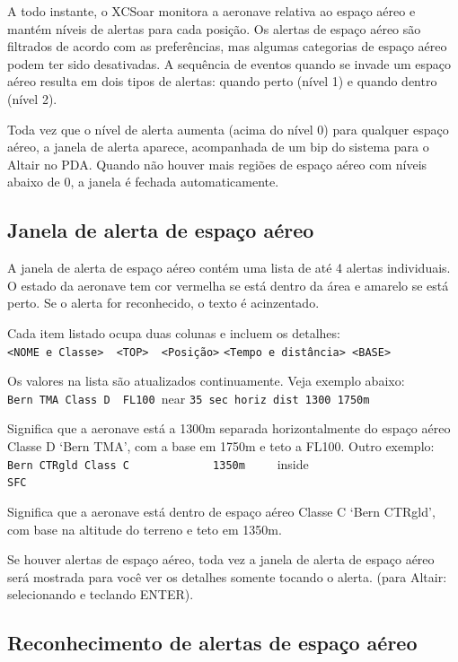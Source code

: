 A todo instante, o XCSoar monitora a aeronave relativa ao espaço aéreo e mantém níveis de alertas para cada posição.  Os alertas de espaço aéreo são filtrados de acordo com as preferências, mas algumas categorias de espaço aéreo podem ter sido desativadas.  
A sequência de eventos quando se invade um espaço aéreo resulta em dois tipos de alertas: quando perto (nível 1) e quando dentro (nível 2).

Toda vez que o nível de alerta aumenta (acima do nível 0) para qualquer espaço aéreo, a janela de alerta aparece, acompanhada de um bip do sistema para o Altair no PDA.  Quando não houver mais regiões de espaço aéreo com níveis abaixo de 0, a janela é fechada automaticamente. 


\subsection*{Janela de alerta de espaço aéreo}

A janela de alerta de espaço aéreo contém uma lista de até 4 alertas individuais.  O estado da aeronave tem cor vermelha se está dentro da área e amarelo se está perto.  Se o alerta for reconhecido, o texto é acinzentado.

Cada item listado ocupa duas colunas e incluem os detalhes:\\
\verb+<NOME e Classe>  <TOP>  <Posição>+ \verb+<Tempo e distância> <BASE>+

Os valores na lista são atualizados continuamente.  Veja exemplo abaixo: \\
\verb+Bern TMA Class D  FL100 +\colorbox{AirspaceYellow}{near} \verb+35 sec horiz dist 1300 1750m+

Significa que a aeronave está a 1300m separada horizontalmente do espaço aéreo Classe D `Bern TMA', com a base em 1750m e teto a FL100.
Outro exemplo:\\
\verb+Bern CTRgld Class C             1350m     +\colorbox{AirspaceRed}{inside}
\verb+                                SFC+

Significa que a aeronave está dentro de espaço aéreo Classe C `Bern CTRgld', com base na altitude do terreno e teto em 1350m.

Se houver alertas de espaço aéreo, toda vez a janela de alerta de espaço aéreo será mostrada para você ver os detalhes somente tocando o alerta. (para Altair: selecionando e teclando ENTER).

\subsection*{Reconhecimento de alertas de espaço aéreo }


